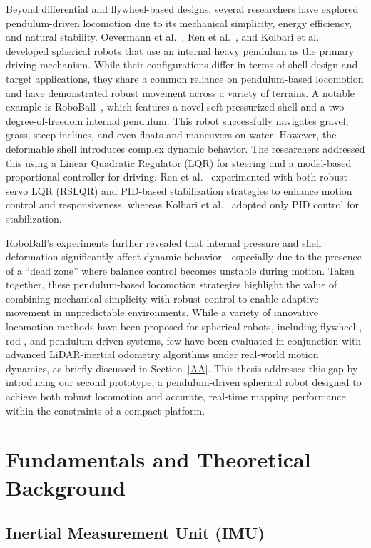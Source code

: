 \documentclass[english, bachelor, utf8]{base/thesis_telematics}
\begin{document}
Beyond differential and flywheel-based designs, several researchers have explored pendulum-driven locomotion due to its mechanical simplicity, energy efficiency, and natural stability. 
Oevermann et al.~\cite{roboball}, Ren et al.~\cite{novelsphere}, and Kolbari et al.~\cite{pendulum_sphere} developed spherical robots that use an internal heavy pendulum as the primary driving mechanism. 
While their configurations differ in terms of shell design and target applications, they share a common reliance on pendulum-based locomotion and have demonstrated robust movement across a variety of terrains.
A notable example is RoboBall~\cite{roboball}, which features a novel soft pressurized shell and a two-degree-of-freedom internal pendulum. 
This robot successfully navigates gravel, grass, steep inclines, and even floats and maneuvers on water. 
However, the deformable shell introduces complex dynamic behavior. 
The researchers addressed this using a Linear Quadratic Regulator (LQR) for steering and a model-based proportional controller for driving. 
Ren et al.~\cite{novelsphere} experimented with both robust servo LQR (RSLQR) and PID-based stabilization strategies to enhance motion control and responsiveness, whereas Kolbari et al.~\cite{pendulum_sphere} adopted only PID control for stabilization. 

RoboBall’s experiments further revealed that internal pressure and shell deformation significantly affect dynamic behavior—especially due to the presence of a ``dead zone'' where balance control becomes unstable during motion.
Taken together, these pendulum-based locomotion strategies highlight the value of combining mechanical simplicity with robust control to enable adaptive movement in unpredictable environments.
While a variety of innovative locomotion methods have been proposed for spherical robots, including flywheel-, rod-, and pendulum-driven systems, few have been evaluated in conjunction with advanced LiDAR-inertial odometry algorithms under real-world motion dynamics, as briefly discussed in Section~\ref{AA}.
This thesis addresses this gap by introducing our second prototype, a pendulum-driven spherical robot designed to achieve both robust locomotion and accurate, real-time mapping performance within the constraints of a compact platform.

\chapter{Fundamentals and Theoretical Background}
\label{ch:fundamentals}
\section{Inertial Measurement Unit (IMU)}
\end{document}
